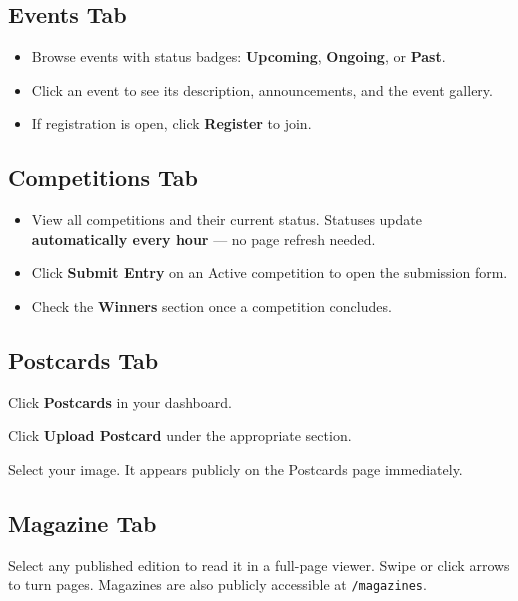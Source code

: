 \documentclass[12pt,a4paper]{article}
\begin{document}
\subsection{Events Tab}

\begin{itemize}
  \item Browse events with status badges: \textbf{Upcoming}, \textbf{Ongoing}, or \textbf{Past}.
  \item Click an event to see its description, announcements, and the event gallery.
  \item If registration is open, click \textbf{Register} to join.
\end{itemize}

\subsection{Competitions Tab}

\begin{itemize}
  \item View all competitions and their current status. Statuses update \textbf{automatically every hour} --- no page refresh needed.
  \item Click \textbf{Submit Entry} on an Active competition to open the submission form.
  \item Check the \textbf{Winners} section once a competition concludes.
\end{itemize}

\subsection{Postcards Tab}

\begin{steps}
\item Click \textbf{Postcards} in your dashboard.
\item Click \textbf{Upload Postcard} under the appropriate section.
\item Select your image. It appears publicly on the Postcards page immediately.
\end{steps}

\subsection{Magazine Tab}

Select any published edition to read it in a full-page viewer. Swipe or click arrows to turn pages. Magazines are also publicly accessible at \texttt{/magazines}.
\end{document}
